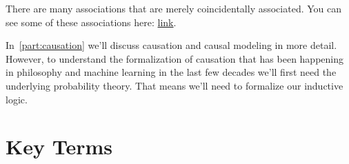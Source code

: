 There are many associations that are merely coincidentally associated. You can see some of these associations here: \href{https://www.tylervigen.com/spurious-correlations}{link}.

In~\ref{part:causation} we'll discuss causation and causal modeling in more detail. However, to understand the formalization of causation that has been happening in philosophy and machine learning in the last few decades we'll first need the underlying probability theory. That means we'll need to formalize our inductive logic.







\section*{Key Terms}
\begin{fullwidth}
\begin{sortedlist}
\end{sortedlist}
\end{fullwidth}
